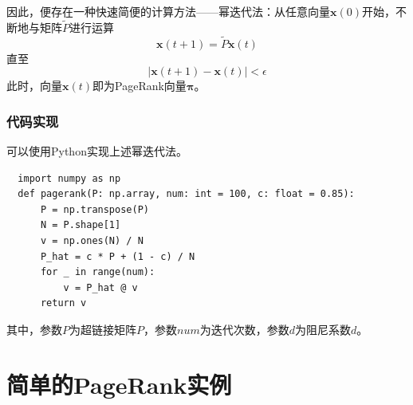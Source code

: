 \documentclass[UTF8,openany]{ctexbook}
\begin{document}
因此，便存在一种快速简便的计算方法——幂迭代法：从任意向量$\boldsymbol{x}(0)$开始，不断地与矩阵$\widetilde{P}$进行运算
\begin{equation}
    \boldsymbol{x}(t+1)=\widetilde{P}\boldsymbol{x}(t)
\end{equation}
直至
\begin{equation}
    |\boldsymbol{x}(t+1)-\boldsymbol{x}(t)|<\epsilon
\end{equation}
此时，向量$\boldsymbol{x}(t)$即为PageRank向量$\boldsymbol{\pi}$。

\subsection[代码实现]{代码实现}
可以使用Python实现上述幂迭代法。

\begin{lstlisting}
  import numpy as np
  def pagerank(P: np.array, num: int = 100, c: float = 0.85):
      P = np.transpose(P)
      N = P.shape[1]
      v = np.ones(N) / N
      P_hat = c * P + (1 - c) / N
      for _ in range(num):
          v = P_hat @ v
      return v
\end{lstlisting}
其中，参数$P$为超链接矩阵$P$，参数$num$为迭代次数，参数$d$为阻尼系数$d$。

\chapter[简单的PageRank实例]{简单的PageRank实例}
\end{document}
